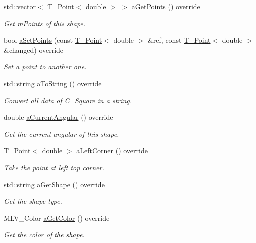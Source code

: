 \begin{DoxyCompactItemize}
std\+::vector$<$ \hyperlink{classT__Point}{T\+\_\+\+Point}$<$ double $>$ $>$ \hyperlink{classC__Square_aca738fec39149ed697f3d2413cd7cec2}{a\+Get\+Points} () override
\begin{DoxyCompactList}\small\item\em Get m\+Points of this shape. \end{DoxyCompactList}\item 
bool \hyperlink{classC__Square_a295a170686422b745587a250ebe08a5e}{a\+Set\+Points} (const \hyperlink{classT__Point}{T\+\_\+\+Point}$<$ double $>$ \&ref, const \hyperlink{classT__Point}{T\+\_\+\+Point}$<$ double $>$ \&changed) override
\begin{DoxyCompactList}\small\item\em Set a point to another one. \end{DoxyCompactList}\item 
std\+::string \hyperlink{classC__Square_ab2cada51b25cd35b9a79e461767e56f0}{a\+To\+String} () override
\begin{DoxyCompactList}\small\item\em Convert all data of \hyperlink{classC__Square}{C\+\_\+\+Square} in a string. \end{DoxyCompactList}\item 
double \hyperlink{classC__Square_ac7779503b305fda4147b735622c66f81}{a\+Current\+Angular} () override
\begin{DoxyCompactList}\small\item\em Get the current angular of this shape. \end{DoxyCompactList}\item 
\hyperlink{classT__Point}{T\+\_\+\+Point}$<$ double $>$ \hyperlink{classC__Square_a13e97bb379f1678636e3baf781c2a01b}{a\+Left\+Corner} () override
\begin{DoxyCompactList}\small\item\em Take the point at left top corner. \end{DoxyCompactList}\item 
std\+::string \hyperlink{classC__Square_a4919017d3750c1b8deb5f07d22069636}{a\+Get\+Shape} () override
\begin{DoxyCompactList}\small\item\em Get the shape type. \end{DoxyCompactList}\item 
M\+L\+V\+\_\+\+Color \hyperlink{classC__Square_a44b1e58b20cc98edc774a73742fec9a7}{a\+Get\+Color} () override
\begin{DoxyCompactList}\small\item\em Get the color of the shape. \end{DoxyCompactList}\item 

\end{DoxyCompactItemize}
